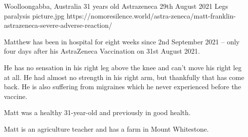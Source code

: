 {Woolloongabba, Australia}
{31 years old}
{Astrazeneca}
{29th August 2021}
{Legs paralysis}
{picture.jpg}
{https://nomoresilence.world/astra-zeneca/matt-franklin-astrazeneca-severe-adverse-reaction/}
{

Matthew has been in hospital for eight weeks since 2nd September 2021 – only
four days after his AstraZeneca Vaccination on 31st August 2021.

He has no sensation in his right leg above the knee and can’t move his right leg
at all. He had almost no strength in his right arm, but thankfully that has come
back. He is also suffering from migraines which he never experienced before the
vaccine.

Matt was a healthy 31-year-old and previously in good health.

Matt is an agriculture teacher and has a farm in Mount Whitestone.

}
